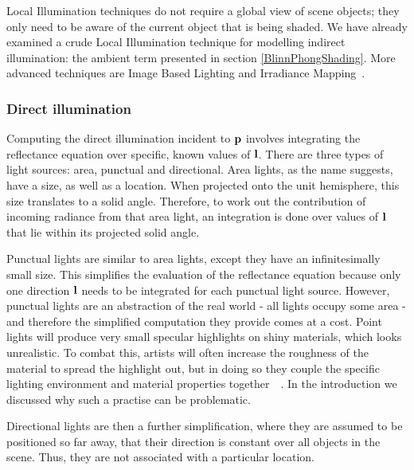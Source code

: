 Local Illumination techniques do not require a global view of scene objects; they only need to be aware of the current object that is being shaded. We have already examined a crude Local Illumination technique for modelling indirect illumination: the ambient term presented in section \ref{BlinnPhongShading}. More advanced techniques are Image Based Lighting and Irradiance Mapping~\cite{HoffmanPBSBackground}\cite{IrradianceMaps}.

\subsubsection{Direct illumination}

Computing the direct illumination incident to \begin{math}\mathbf{p}\end{math} involves integrating the reflectance equation over specific, known values of \begin{math}\mathbf{l}\end{math}. There are three types of light sources: area, punctual and directional. Area lights, as the name suggests, have a size, as well as a location. When projected onto the unit hemisphere, this size translates to a solid angle. Therefore, to work out the contribution of incoming radiance from that area light, an integration is done over values of \begin{math}\mathbf{l}\end{math} that lie within its projected solid angle.

Punctual lights are similar to area lights, except they have an infinitesimally small size. This simplifies the evaluation of the reflectance equation because only one direction \begin{math}\mathbf{l}\end{math} needs to be integrated for each punctual light source. However, punctual lights are an abstraction of the real world - all lights occupy some area - and therefore the simplified computation they provide comes at a cost. Point lights will produce very small specular highlights on shiny materials, which looks unrealistic. To combat this, artists will often increase the roughness of the material to spread the highlight out, but in doing so they couple the specific lighting environment and material properties together~\cite{MovingFrostbitetoPBR}~\cite{RealShadingInUnreal}. In the introduction we discussed why such a practise can be problematic.

Directional lights are then a further simplification, where they are assumed to be positioned so far away, that their direction is constant over all objects in the scene. Thus, they are not associated with a particular location.

